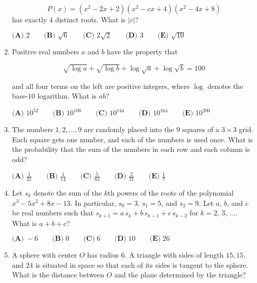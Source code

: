\documentclass{article}
\begin{document}
\begin{enumerate}[label=\arabic*., itemsep=0.5em]
\begin{equation*}
P(x) = (x^2 - 2x + 2)(x^2 - cx + 4)(x^2 - 4x + 8)
\end{equation*}
has exactly 4 distinct roots. What is \(|c|\)?

\(\textbf{(A) } 2 \qquad \textbf{(B) } \sqrt{6} \qquad \textbf{(C) } 2\sqrt{2} \qquad \textbf{(D) } 3 \qquad \textbf{(E) } \sqrt{10}\)\par \vspace{0.5em}\item Positive real numbers \(a\) and \(b\) have the property that

\begin{equation*}
\sqrt{\log{a}} + \sqrt{\log{b}} + \log \sqrt{a} + \log \sqrt{b} = 100
\end{equation*}


and all four terms on the left are positive integers, where \(\log\) denotes the base-\(10\) logarithm. What is \(ab\)?

\(\textbf{(A) }   10^{52}   \qquad        \textbf{(B) }   10^{100}   \qquad    \textbf{(C) }   10^{144}   \qquad   \textbf{(D) }  10^{164} \qquad  \textbf{(E) }   10^{200} \)\par \vspace{0.5em}\item The numbers \(1,2,\dots,9\) are randomly placed into the \(9\) squares of a \(3 \times 3\) grid. Each square gets one number, and each of the numbers is used once. What is the probability that the sum of the numbers in each row and each column is odd?

\(\textbf{(A) }\frac{1}{21}\qquad\textbf{(B) }\frac{1}{14}\qquad\textbf{(C) }\frac{5}{63}\qquad\textbf{(D) }\frac{2}{21}\qquad\textbf{(E) } \frac17\)\par \vspace{0.5em}\item Let \(s_k\) denote the sum of the \(\textit{k}\)th powers of the roots of the polynomial \(x^3-5x^2+8x-13\). In particular, \(s_0=3\), \(s_1=5\), and \(s_2=9\). Let \(a\), \(b\), and \(c\) be real numbers such that \(s_{k+1} = a \, s_k + b \, s_{k-1} + c \, s_{k-2}\) for \(k = 2\), \(3\), \(....\) What is \(a+b+c\)?

\(\textbf{(A)} \; -6 \qquad \textbf{(B)} \; 0 \qquad \textbf{(C)} \; 6 \qquad \textbf{(D)} \; 10 \qquad \textbf{(E)} \; 26\)\par \vspace{0.5em}\item A sphere with center \(O\) has radius \(6\). A triangle with sides of length \(15, 15,\) and \(24\) is situated in space so that each of its sides is tangent to the sphere. What is the distance between \(O\) and the plane determined by the triangle?


\end{enumerate}
\end{document}
